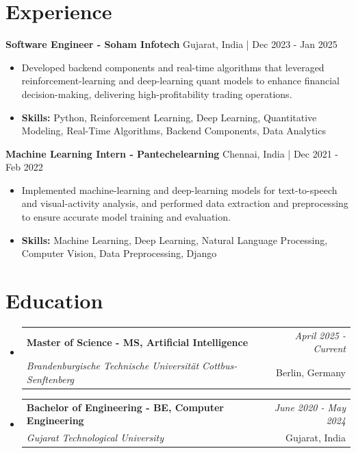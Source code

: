 \documentclass[a4paper,11pt]{article}
\makeatletter
\newcommand{\resumeSubheading}[4]{
\vspace{0.5mm}\item
    \begin{tabular*}{\linewidth}[t]{l@{\extracolsep{\fill}}r}
        \textbf{#1} & \textit{\footnotesize{#4}} \\
        \textit{\footnotesize{#3}} &  \footnotesize{#2}\\
    \end{tabular*}
    \vspace{-2.4mm}
}
\makeatother
\begin{document}
\section{\textbf{Experience}}


\vspace{1mm}
  \textbf{Software Engineer - Soham Infotech} \hfill Gujarat, India | Dec 2023 - Jan 2025
\vspace{-1.5mm} %
\begin{itemize}
  \item Developed backend components and real-time algorithms that leveraged reinforcement-learning and deep-learning quant models to enhance financial decision-making, delivering high-profitability trading operations.

\vspace{-2mm}
  \item \textbf{Skills:} Python, Reinforcement Learning, Deep Learning, Quantitative Modeling, Real-Time Algorithms, Backend Components, Data Analytics
\end{itemize}

\vspace{1mm}
  \textbf{Machine Learning Intern - Pantechelearning} \hfill Chennai, India | Dec 2021 - Feb 2022
\vspace{-1.5mm} %
\begin{itemize}
  \item Implemented machine-learning and deep-learning models for text-to-speech and visual-activity analysis, and performed data extraction and preprocessing to ensure accurate model training and evaluation.
\vspace{-2mm}
  \item \textbf{Skills:} Machine Learning, Deep Learning, Natural Language Processing, Computer Vision, Data Preprocessing, Django
\end{itemize}\section{\textbf{Education}}
\vspace{-0.4mm}

\begin{itemize}[leftmargin=0.15in, label={}]
\resumeSubheading
{Master of Science - MS, Artificial Intelligence }{Berlin, Germany}
{Brandenburgische Technische Universität Cottbus-Senftenberg  }{April 2025 - Current}

\vspace{1.0mm} %
\resumeSubheading
{Bachelor of Engineering - BE, Computer Engineering  }{Gujarat, India}
{Gujarat Technological University }{June 2020 - May 2024}

\end{itemize}
\end{document}

